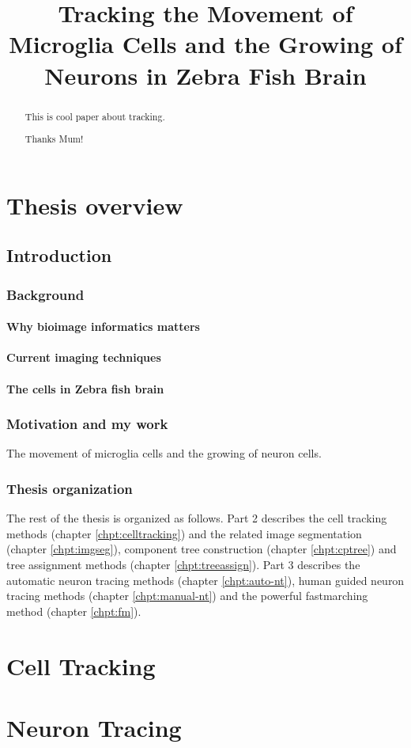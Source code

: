 \documentclass[b5,12pt]{report}
\title{Tracking the Movement of Microglia Cells and the Growing of Neurons in Zebra Fish Brain}
\begin{document}
\maketitle
\begin{abstract}
 This is cool paper about tracking.
\end{abstract}
\renewcommand{\abstractname}{Acknowledgements}
\begin{abstract}
 Thanks Mum!
\end{abstract}

\tableofcontents
\listoffigures
\part{Thesis overview}
\chapter{Introduction}
\section{Background}
\subsection{Why bioimage informatics matters}
\subsection{Current imaging techniques}
\subsection{The cells in Zebra fish brain}
\section{Motivation and my work}
The movement of microglia cells and the growing of neuron cells.
\section{Thesis organization}
The rest of the thesis is organized as follows. Part 2 describes the cell tracking methods (chapter \ref{chpt:celltracking}) and the related image segmentation (chapter \ref{chpt:imgseg}), component tree construction (chapter \ref{chpt:cptree}) and tree assignment methods (chapter \ref{chpt:treeassign}). Part 3 describes the automatic neuron tracing methods (chapter \ref{chpt:auto-nt}), human guided neuron tracing methods (chapter \ref{chpt:manual-nt}) and the powerful fastmarching method (chapter \ref{chpt:fm}).
\part{Cell Tracking}
\part{Neuron Tracing}





\end{document}
